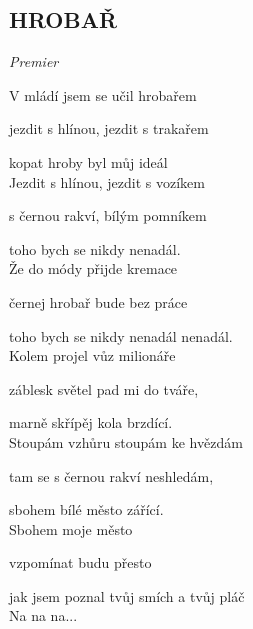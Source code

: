 \begin{flushleft}
	\section*{\Huge HROBAŘ}
	\emph{Premier}
\end{flushleft}

V mládí jsem se učil hrobařem

jezdit s hlínou, jezdit s trakařem

kopat hroby byl můj ideál \hspace{0.5cm} \\


Jezdit s hlínou, jezdit s vozíkem

s černou rakví, bílým pomníkem

toho bych se nikdy nenadál.\\

Že do módy přijde kremace

černej hrobař bude bez práce

toho bych se nikdy nenadál nenadál.\\

Kolem projel vůz milionáře

záblesk světel pad mi do tváře,

marně skřípěj kola brzdící.\\

Stoupám vzhůru stoupám ke hvězdám

tam se s černou rakví neshledám,

sbohem bílé město zářící.\\

Sbohem moje město

vzpomínat budu přesto

jak jsem poznal tvůj smích a tvůj pláč\\

Na na na...

\newpage
